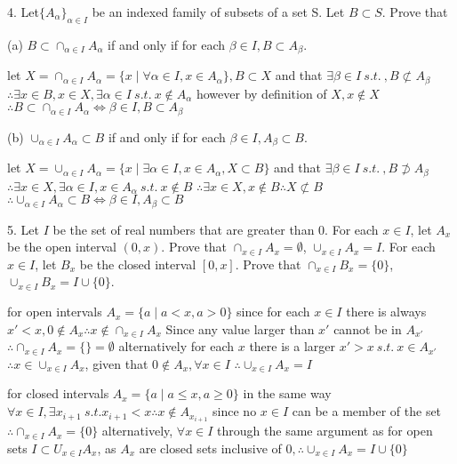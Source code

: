 4. Let$ \{ A_{\alpha}\}_{\alpha \in I} $ be an indexed family of subsets of a set S. Let $B \subset S$. Prove that

 (a) $B \subset \cap_{\alpha \in I} A_{\alpha}$ if and only if for each $\beta \in I, B \subset A_{\beta}$.

let  $ X = \cap_{\alpha \in I} A_{\alpha} =  \{ x \mid \forall \alpha \in I,  x \in A_{\alpha}\}, B \subset X$ and that $\exists \beta \in I\ s.t.\ ,B \not \subset A_{\beta}$
$\therefore \exists x \in B, x \in X, \exists \alpha \in I\ s.t.\ x \not \in A_{\alpha}$
however by definition of $X, x\not \in X$
$\therefore B \subset \cap_{\alpha \in I} A_{\alpha} \iff \beta \in I, B \subset A_{\beta}$

(b) $\cup_{\alpha \in I} A_{\alpha} \subset B$ if and only if for each $\beta \in I, A_{\beta} \subset B$.


let $X = \cup_{\alpha \in I} A_{\alpha} = \{ x \mid \exists \alpha \in I, x \in A_{\alpha}, X \subset B\}$ and that $\exists \beta \in I\ s.t.\ ,B \not \supset A_{\beta}$
$\therefore \exists x \in X, \exists \alpha \in I, x \in A_{\alpha}\ s.t.\ x \not \in B$
$\therefore \exists x \in X, x\not \in B \therefore X \not \subset B$
$\therefore \cup_{\alpha \in I} A_{\alpha} \subset B \iff \beta \in I, A_{\beta} \subset B$

5. Let $I$ be the set of real numbers that are greater than $0$. For each $x \in I$, let $A_{x}$ be the open interval $(0, x)$. 
Prove that $\cap_{x\in I} A_{x} = \emptyset$, $\cup_{x \in I} A_{x} = I$. 
For each $x\in I$, let $B_{x}$ be the closed interval $[ 0, x]$.  
Prove that $\cap_{x \in I } B_{x} = \{ 0\}$, $\cup_{x \in I} B_{x} = I \cup \{ 0\}$.

for open intervals
$A_{x} = \{ a \mid a < x, a > 0\}$
since for each $x \in I$ there is always $x' < x, 0 \not \in A_{x}\therefore x \not \in \cap_{x\in I}A_{x}$  Since any value larger than $x'$ cannot be in $A_{x'}$
$\therefore \cap_{x \in I}A_{x} = \{\} = \emptyset$
alternatively for each $x $ there is a larger $x'>x\ s.t.\ x \in A_{x'}$ 
$\therefore x \in \cup_{x \in I} A_{x}$, given that $0 \not \in A_{x}, \forall x \in I$
$\therefore \cup_{x \in I } A_{x} = I$

for closed intervals
$A_{x} = \{ a \mid a  \leq x, a \geq 0\}$
in the same way $\forall x\in I, \exists x_{i+1} \ s.t. x_{i+1} < x \therefore x \not \in  A_{x_{i+1}}$ since no $x \in I$ can be a member of the set
$\therefore \cap_{x \in I} A_{x} = \{0\}$
alternatively, $\forall x\in I$ through the same argument as for open sets $I \subset U_{x \in I}A_{x}$, as $A_{x}$ are closed sets inclusive of $0, \therefore \cup_{x \in I} A_{x} = I \cup \{ 0\}$
